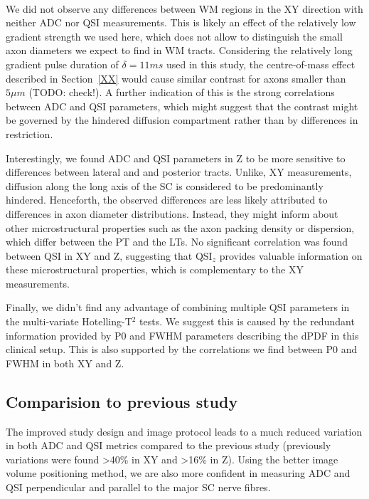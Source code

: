\paragraph{} We did not observe any differences between WM regions in the XY direction with neither ADC nor QSI measurements. This is likely an effect of the relatively low gradient strength we used here,  which does not allow to distinguish the small axon diameters we expect to find in WM tracts. Considering the relatively long gradient pulse duration of $\delta=11ms$ used in this study, the centre-of-mass effect described in Section~\ref{XX} would cause similar contrast for axons smaller than $5\mu m$ (TODO: check!). A further indication of this is the strong correlations between ADC and QSI parameters, which might suggest that the contrast might be governed by the hindered diffusion compartment rather than by differences in restriction.

Interestingly, we found ADC and QSI parameters in Z to be more sensitive to differences between lateral and and posterior tracts. Unlike, XY measurements, diffusion along the long axis of the SC is considered to be predominantly hindered. Henceforth, the observed differences are less likely attributed to differences in axon diameter distributions. Instead, they might inform about other microstructural properties such as the axon packing density or dispersion, which differ between the PT and the LTs. No significant correlation was found between QSI in XY and Z, suggesting that QSI$_z$ provides valuable information on these microstructural properties, which is complementary to the XY measurements.

Finally, we didn't find any advantage of combining multiple QSI parameters in the multi-variate Hotelling-T$^2$ tests. We suggest this is caused by the redundant information provided by P0 and FWHM parameters describing the dPDF in this clinical setup. This is also supported by the correlations we find between P0 and FWHM in both XY and Z.

\subsection*{Comparision to previous study}
The improved study design and image protocol leads to a much reduced variation in both ADC and QSI metrics compared to the previous study (previously variations were found >40\% in XY and >16\% in Z). Using the better image volume positioning method, we are also more confident in measuring ADC and QSI perpendicular and parallel to the major SC nerve fibres.

